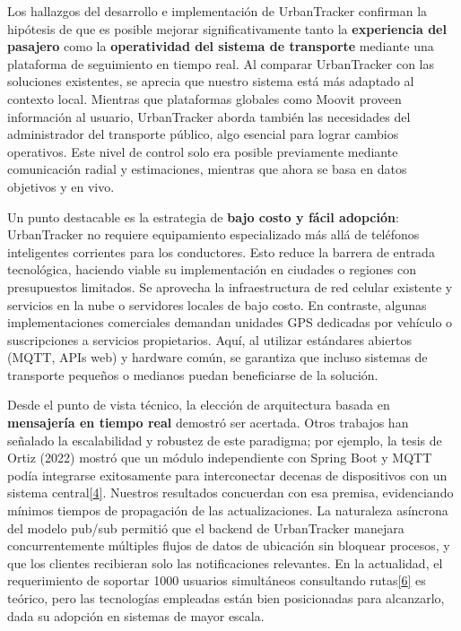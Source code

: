 Los hallazgos del desarrollo e implementación de UrbanTracker confirman la hipótesis de que es posible mejorar significativamente tanto la \textbf{experiencia del pasajero} como la \textbf{operatividad del sistema de transporte} mediante una plataforma de seguimiento en tiempo real. Al comparar UrbanTracker con las soluciones existentes, se aprecia que nuestro sistema está más adaptado al contexto local. Mientras que plataformas globales como Moovit proveen información al usuario, UrbanTracker aborda también las necesidades del administrador del transporte público, algo esencial para lograr cambios operativos. Este nivel de control solo era posible previamente mediante comunicación radial y estimaciones, mientras que ahora se basa en datos objetivos y en vivo.

Un punto destacable es la estrategia de \textbf{bajo costo y fácil adopción}: UrbanTracker no requiere equipamiento especializado más allá de teléfonos inteligentes corrientes para los conductores. Esto reduce la barrera de entrada tecnológica, haciendo viable su implementación en ciudades o regiones con presupuestos limitados. Se aprovecha la infraestructura de red celular existente y servicios en la nube o servidores locales de bajo costo. En contraste, algunas implementaciones comerciales demandan unidades GPS dedicadas por vehículo o suscripciones a servicios propietarios. Aquí, al utilizar estándares abiertos (MQTT, APIs web) y hardware común, se garantiza que incluso sistemas de transporte pequeños o medianos puedan beneficiarse de la solución.

Desde el punto de vista técnico, la elección de arquitectura basada en \textbf{mensajería en tiempo real} demostró ser acertada. Otros trabajos han señalado la escalabilidad y robustez de este paradigma; por ejemplo, la tesis de Ortiz (2022) mostró que un módulo independiente con Spring Boot y MQTT podía integrarse exitosamente para interconectar decenas de dispositivos con un sistema central\href{https://bibliotecadigital.udea.edu.co/entities/publication/3eb20d8e-dece-489f-8bcc-89f009b482cf\#:~:text=entre\%20las\%20m\%C3\%A1quinas\%20y\%20el,logrando\%20as\%C3\%AD\%20una\%20comunicaci\%C3\%B3n\%20bidireccional}{{[}4{]}}. Nuestros resultados concuerdan con esa premisa, evidenciando mínimos tiempos de propagación de las actualizaciones. La naturaleza asíncrona del modelo pub/sub permitió que el backend de UrbanTracker manejara concurrentemente múltiples flujos de datos de ubicación sin bloquear procesos, y que los clientes recibieran solo las notificaciones relevantes. En la actualidad, el requerimiento de soportar 1000 usuarios simultáneos consultando rutas\href{file://file-HuN9cjU571rmLYaT6jabAp\#:~:text=,2\%20segundos\%20tras\%20su\%20recepci\%C3\%B3n}{{[}6{]}} es teórico, pero las tecnologías empleadas están bien posicionadas para alcanzarlo, dada su adopción en sistemas de mayor escala.

